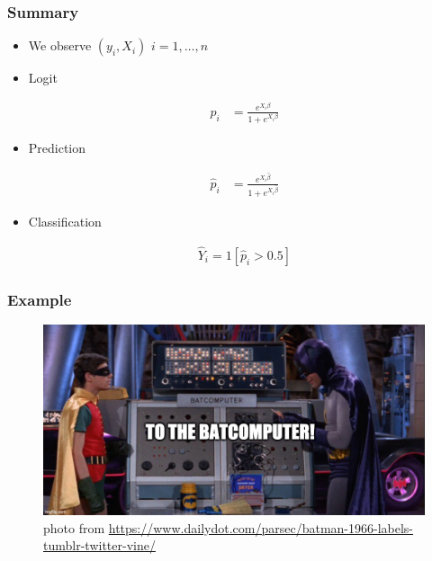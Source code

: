 \documentclass[
  shownotes,
  xcolor={svgnames},
  hyperref={colorlinks,citecolor=DarkBlue,linkcolor=andesred,urlcolor=DarkBlue}
  , aspectratio=169]{beamer}
\begin{document}
\begin{frame}[fragile]
\frametitle{Summary}

\begin{itemize}
  \item We observe $(y_i,X_i)$ $i=1,\dots,n$
  \medskip
  \item Logit


\begin{align}
p_i &=\frac{e^{X_i\beta}}{1+e^{X_i\beta}}
\end{align}

\item Prediction


\begin{align}
\hat{p}_i &=\frac{e^{X_i\hat{\beta}}}{1+e^{X_i\hat{\beta}}}
\end{align}
\item Classification 

\begin{align}
\hat{Y}_i= 1[\hat{p}_i >0.5]
\end{align}
\end{itemize}
\end{frame}
\begin{frame}[fragile]
\frametitle{Example}
\begin{figure}[H] \centering
  \centering
  \includegraphics[scale=0.35]{figures/baticomputer_meme.jpg}
  \\
  \tiny photo from \url{https://www.dailydot.com/parsec/batman-1966-labels-tumblr-twitter-vine/}
\end{figure}


\end{frame}

\end{document}
